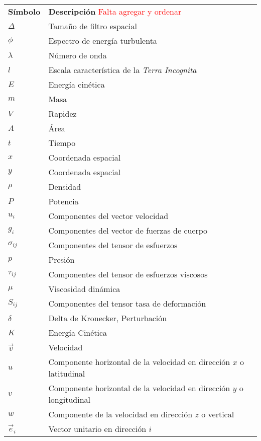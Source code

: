 
\begin{tabular}{ll}
	\textbf{Símbolo} & \textbf{Descripción} \textcolor{red}{Falta agregar y ordenar} \\
	$\Delta$ & Tamaño de filtro espacial  \\
	$\phi$ & Espectro de energía turbulenta  \\
	$\lambda$ & Número de onda  \\
	$l$ & Escala característica de la \emph{Terra Incognita}  \\
	$E$ & Energía cinética  \\
	$m$ & Masa    \\
	$V$ & Rapidez     \\
	$A$ & Área   \\
	$t$ & Tiempo     \\
	$x$ & Coordenada espacial  \\
	$y$ & Coordenada espacial  \\
	$\rho$ & Densidad     \\
	$P$ & Potencia    \\
	$u_i$ & Componentes del vector velocidad     \\
	$g_i$ & Componentes del vector de fuerzas de cuerpo     \\
	$\sigma_{ij}$ & Componentes del tensor de esfuerzos     \\
	$p$ & Presión     \\
	$\tau_{ij}$ & Componentes del tensor de esfuerzos viscosos    \\
	$\mu$ & Viscosidad dinámica     \\
	$S_{ij}$ & Componentes del tensor tasa de deformación    \\
	$\delta$ & Delta de Kronecker, Perturbación     \\
	$K$ & Energía Cinética      \\
	$\vec{v}$ & Velocidad  \\
	$u$ & Componente horizontal de la velocidad en dirección $x$ o latitudinal \\
	$v$ & Componente horizontal de la velocidad en dirección $y$ o longitudinal  \\
	$w$ & Componente de la velocidad en dirección $z$ o vertical  \\
	$\vec{e}_i$ & Vector unitario en dirección $i$ \\
\end{tabular}
	\newpage
